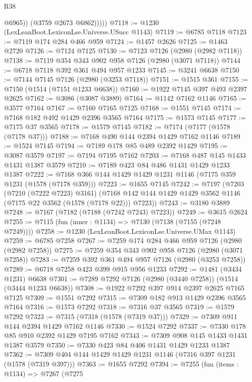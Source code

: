 \begin{lexlean}{R38}
\begin{coremodule}
                @6965))
            (@3759 @2673 @6862)))))
@7118 := @1230 (LexLeanBoot.LexiconLse.Universe.USucc @1143)
@7119 := @6785 @7118
@7123 := @7119 @174 @284 @466 @959
@7124 := @1457 @2626
@7125 := @1463 @2720
@7126 := @7124 @7125
@7130 := @7123 @7126 (@2980 (@2982 @7118))
@7138 := @7119 @354 @343 @902 @958 @7126 (@2980 (@3071 @7118))
@7144 := @6718 @7118 @392 @361 @494 @957 @1233
@7145 := @3241 @6638
@7150 := @7144 @7145 @7126 (@2980 (@3253 @7118))
@7151 := @1515 @361
@7155 := @7150 (@1514 (@7151 @1233 @6638))
@7160 := @1922 @7145 @397 @493 @2397 @2625
@7162 := @3086 (@3087 @3889)
@7164 := @1142 @7162 @1146
@7165 := @3577 @7164
@7167 := @7160 @7165 @7125
@7168 := @1551 @7145
@7174 := @7168 @182 @492 @1429 @2396 @3565 @7164
@7175 := @1573 @7145
@7177 := @7175 @37 @3565
@7178 := @1579 @7145
@7182 := @7174 (@7177 (@1578 (@7178 @37)))
@7188 := @7168 @490 @144 @2394 @1429 @7162 @1146
@7189 := @1524 @7145
@7194 := @7189 @178 @85 @489 @2392 @1429
@7195 := @3087 @3579
@7197 := @7194 @7195 @7162
@7203 := @7168 @487 @145 @1433 @1431 @1387 @3579
@7210 := @7189 @423 @84 @486 @1431 @1429 @1233 @1387
@7222 := @7168 @366 @144 @1429 @1429 @1231 @1146 (@7175 @359 @1231 (@1578 (@7178 @359)))
@7223 := @1655 @7145
@7242 := @7197
    (@7203
      (@7210 (@7222 @7223) @3161)
      (@7168 @142 @144 @1429 @1429 @3562 @1146 (@7175 @22 @3562 (@1578 (@7178 @22))) @7223))
@7243 := @3180 @3889
@7248 := @7167 (@7182 (@7188 (@7242 @7243) @7223))
@7249 := @3615 @2624
@7255 := @7115 (fun (inner : @1134) => @7130 (@7138 (@7155 (@7248 @7249))))
@7258 := @1230 (LexLeanBoot.LexiconLse.Universe.UMax @1143)
@7259 := @6785 @7258
@7267 := @7259 @174 @284 @466 @959 @7126 (@2980 (@2982 @7258))
@7275 := @7259 @354 @343 @902 @958 @7126 (@2980 (@3071 @7258))
@7283 := @7259 @392 @361 @494 @957 @7126 (@2980 (@3253 @7258))
@7289 := @6718 @7258 @423 @399 @915 @956 @1233
@7292 := @1481 (@3434 @1231) @6638
@7301 := @7289 @7292 @7126 (@2980 (@3440 @7258)) (@1514 (@3444 @1233 @6638))
@7308 := @1922 @7292 @397 @914 @2397 @2625 @7165 @7125
@7309 := @1551 @7292
@7315 := @7309 @182 @913 @1429 @2396 @3565 @7164
@7316 := @1573 @7292
@7318 := @7316 @37 @3565
@7319 := @1579 @7292
@7323 := @7315 (@7318 (@1578 (@7319 @37)))
@7329 := @7309 @911 @144 @2394 @1429 @7162 @1146
@7330 := @1524 @7292
@7337 := @7330 @178 @85 @910 @2392 @1429 @7195 @7162
@7343 := @7309 @908 @145 @1433 @1431 @1387 @3579
@7350 := @7330 @423 @84 @406 @1431 @1429 @1233 @1387
@7362 := @7309 @404 @144 @1429 @1429 @1231 @1146 (@7316 @397 @1231 (@1578 (@7319 @397)))
@7363 := @1655 @7292
@7394 := @7255
    (fun (items : @1134) =>
    @7267
      (@7275

\end{coremodule}
\end{lexlean}
